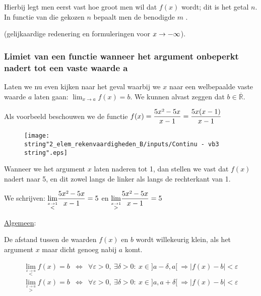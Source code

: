 Hierbij legt men eerst vast hoe groot men wil dat $f(x)$ wordt; dit
is het getal $n$. In functie van die gekozen $n$ bepaalt men de
benodigde $m$ .

(gelijkaardige redenering en formuleringen voor $x\rightarrow\text{\textminus\ensuremath{\infty}}$).


\subsubsection{Limiet van een functie wanneer het argument onbeperkt nadert tot
een vaste waarde a}

Laten we nu even kijken naar het geval waarbij we $x$ naar een welbepaalde
vaste waarde $a$ laten gaan: ${\displaystyle \lim_{x\to a}}f(x)=b$.
We kunnen alvast zeggen dat $b\in\overline{\mathbb{R}}$.

\noindent Als voorbeeld beschouwen we de functie $f(x)={\displaystyle \frac{5x\text{\texttwosuperior}-5x}{x-1}}={\displaystyle \frac{5x(x-1)}{x-1}}$ 

\begin{figure}[h]
\centering{}\texttt{[image: \\string"2\_elem\_rekenvaardigheden\_B/inputs/Continu - vb3\\string".eps]} 
\end{figure}

\noindent Wanneer we het argument $x$ laten naderen tot 1, dan stellen
we vast dat $f(x)$ nadert naar 5, en dit zowel langs de linker als
langs de rechterkant van 1.

\medskip{}


\noindent We schrijven: ${\displaystyle \lim_{\overset{x\rightarrow1}{<}}}{\displaystyle \frac{5x\text{\texttwosuperior}-5x}{x-1}}=5$
en ${\displaystyle \lim_{\overset{x\rightarrow1}{>}}}{\displaystyle \frac{5x\text{\texttwosuperior}-5x}{x-1}}=5$ 

\medskip{}


\noindent \uline{Algemeen}:

De afstand tussen de waarden $f(x)$ en $b$ wordt willekeurig klein,
als het argument $x$ maar dicht genoeg nabij $a$ komt.

\begin{eqnarray*}
{\displaystyle \lim_{\overset{x\rightarrow a}{<}}}f(x)=b & \Leftrightarrow & \forall\varepsilon>0,\:\exists\delta>0:\:x\in]a-\delta,a[\:\Rightarrow\left|f(x)-b\right|<\varepsilon\\
{\displaystyle \lim_{\overset{x\rightarrow a}{>}}}f(x)=b & \Leftrightarrow & \forall\varepsilon>0,\:\exists\delta>0:\:x\in]a,a+\delta[\:\Rightarrow\left|f(x)-b\right|<\varepsilon\\
\end{eqnarray*}


